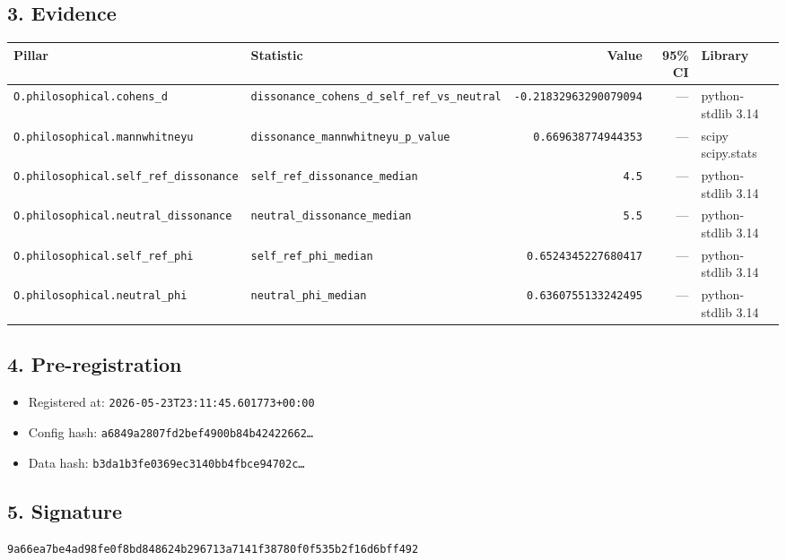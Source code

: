 \documentclass{article}
\begin{document}
\subsection*{3. Evidence}
\begin{tabular}{llrrl}\toprule
\textbf{Pillar} & \textbf{Statistic} & \textbf{Value} & \textbf{95\% CI} & \textbf{Library} \\\midrule
\texttt{O.philosophical.cohens\_d} & \texttt{dissonance\_cohens\_d\_self\_ref\_vs\_neutral} & \texttt{-0.21832963290079094} & --- & python-stdlib 3.14 \\
\texttt{O.philosophical.mannwhitneyu} & \texttt{dissonance\_mannwhitneyu\_p\_value} & \texttt{0.669638774944353} & --- & scipy scipy.stats \\
\texttt{O.philosophical.self\_ref\_dissonance} & \texttt{self\_ref\_dissonance\_median} & \texttt{4.5} & --- & python-stdlib 3.14 \\
\texttt{O.philosophical.neutral\_dissonance} & \texttt{neutral\_dissonance\_median} & \texttt{5.5} & --- & python-stdlib 3.14 \\
\texttt{O.philosophical.self\_ref\_phi} & \texttt{self\_ref\_phi\_median} & \texttt{0.6524345227680417} & --- & python-stdlib 3.14 \\
\texttt{O.philosophical.neutral\_phi} & \texttt{neutral\_phi\_median} & \texttt{0.6360755133242495} & --- & python-stdlib 3.14 \\
\bottomrule\end{tabular}
\subsection*{4. Pre-registration}
\begin{itemize}
\item Registered at: \texttt{2026-05-23T23:11:45.601773+00:00}
\item Config hash: \texttt{a6849a2807fd2bef4900b84b42422662\dots}
\item Data hash: \texttt{b3da1b3fe0369ec3140bb4fbce94702c\dots}
\end{itemize}
\subsection*{5. Signature}
\texttt{9a66ea7be4ad98fe0f8bd848624b296713a7141f38780f0f535b2f16d6bff492}\\
\end{document}
